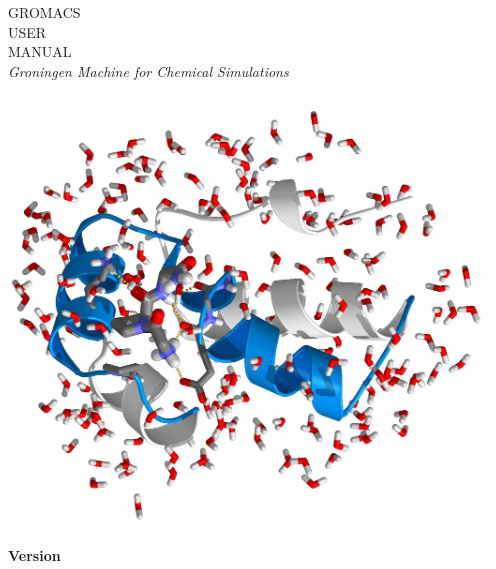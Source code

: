 \documentclass[11pt,a4paper,twoside]{gmxmanual}
\begin{document}

\addtolength{\oddsidemargin}{-5mm}

%
%
\pagestyle{empty}
\begin{center}

{
\fontsize{64}{70} \selectfont 
GROMACS\\
USER \\
MANUAL\\
}
\vspace{1cm}
{\Large \em Groningen Machine for Chemical Simulations}

\vspace{0.75cm}
\includegraphics[width=5in]{plots/fp-highres}

\vspace{0.25cm}
{\fontsize{30}{36} \selectfont \bf Version \gmxver}

\end{center}
\vfill

\cleardoublepage
\addtolength{\oddsidemargin}{5mm}

%
%
\renewcommand{\chaptermark}[1]{\markboth{#1}{#1}} %
\renewcommand{\sectionmark}[1]{\markright{\thesection\ #1}}
\lhead[\fancyplain{}{\em\thepage}]{\fancyplain{}{\em\rightmark}}
\rhead[\fancyplain{}{\em\leftmark}]{\fancyplain{}{\em\thepage}}
\cfoot{}
\end{document}
